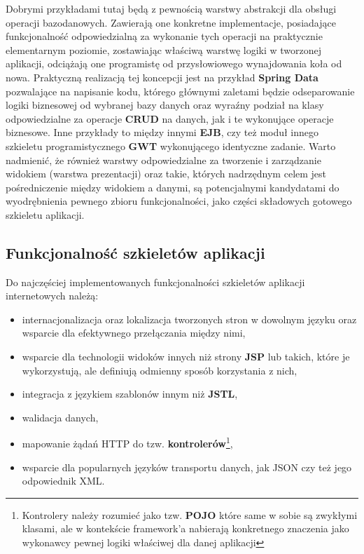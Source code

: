 	Dobrymi przykładami tutaj będą z pewnością warstwy abstrakcji dla obsługi operacji bazodanowych. Zawierają one konkretne implementacje, posiadające funkcjonalność odpowiedzialną za wykonanie tych operacji na praktycznie elementarnym poziomie, zostawiając właściwą warstwę logiki w tworzonej aplikacji, odciążają one programistę od przysłowiowego wynajdowania koła od nowa. Praktyczną realizacją tej koncepcji jest na przykład \textbf{Spring Data} pozwalające na napisanie kodu, którego głównymi zaletami będzie odseparowanie logiki biznesowej od wybranej bazy danych oraz wyraźny podział na klasy odpowiedzialne za operacje \textbf{CRUD} na danych, jak i te wykonujące operacje biznesowe. Inne przykłady to między innymi \textbf{EJB}, czy też moduł innego szkieletu programistycznego \textbf{GWT} wykonującego identyczne zadanie. Warto nadmienić, że również warstwy odpowiedzialne za tworzenie i zarządzanie widokiem (warstwa prezentacji) oraz takie, których nadrzędnym celem jest pośredniczenie między widokiem a danymi, są potencjalnymi kandydatami do wyodrębnienia pewnego zbioru funkcjonalności, jako części składowych gotowego szkieletu aplikacji. 
	
	\subsection{Funkcjonalność szkieletów aplikacji}
		Do najczęściej implementowanych funkcjonalności szkieletów aplikacji internetowych należą:
		\begin{itemize}
			\item internacjonalizacja oraz lokalizacja tworzonych stron w dowolnym języku oraz wsparcie dla efektywnego przełączania między nimi,
			\item wsparcie dla technologii widoków innych niż strony \textbf{JSP} lub takich, które je wykorzystują, ale definiują odmienny sposób korzystania z nich,
			\item integracja z językiem szablonów innym niż \textbf{JSTL},
			\item walidacja danych,
			\item mapowanie żądań HTTP do tzw. \textbf{kontrolerów}\footnote{Kontrolery należy rozumieć jako tzw. \textbf{POJO} które same w sobie są zwykłymi klasami, ale w kontekście framework'a nabierają konkretnego znaczenia jako wykonawcy pewnej logiki właściwej dla danej aplikacji},
			\item wsparcie dla popularnych języków transportu danych, jak JSON czy też jego odpowiednik XML. 
		\end{itemize}
	
